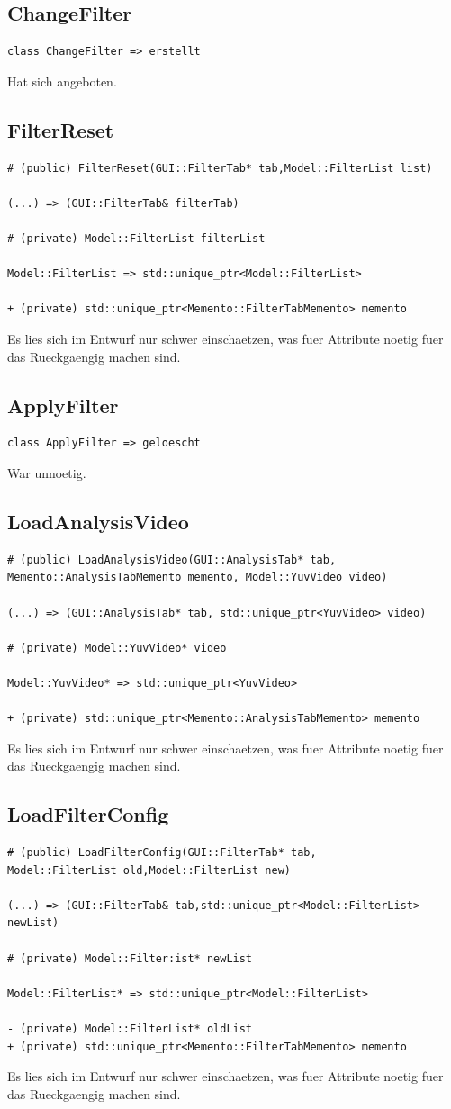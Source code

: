 \documentclass[parskip=full]{scrartcl}
\begin{document}
\subsection{ChangeFilter}
\begin{verbatim}
class ChangeFilter => erstellt
\end{verbatim}
Hat sich angeboten.
\subsection{FilterReset}
\begin{verbatim}
# (public) FilterReset(GUI::FilterTab* tab,Model::FilterList list)

(...) => (GUI::FilterTab& filterTab)

# (private) Model::FilterList filterList

Model::FilterList => std::unique_ptr<Model::FilterList>

+ (private) std::unique_ptr<Memento::FilterTabMemento> memento
\end{verbatim}
Es lies sich im Entwurf nur schwer einschaetzen, was fuer Attribute noetig fuer das Rueckgaengig machen sind. 
\subsection{ApplyFilter}
\begin{verbatim}
class ApplyFilter => geloescht
\end{verbatim}
War unnoetig.
\subsection{LoadAnalysisVideo}
\begin{verbatim}
# (public) LoadAnalysisVideo(GUI::AnalysisTab* tab, 
Memento::AnalysisTabMemento memento, Model::YuvVideo video)

(...) => (GUI::AnalysisTab* tab, std::unique_ptr<YuvVideo> video)

# (private) Model::YuvVideo* video

Model::YuvVideo* => std::unique_ptr<YuvVideo>

+ (private) std::unique_ptr<Memento::AnalysisTabMemento> memento
\end{verbatim}
Es lies sich im Entwurf nur schwer einschaetzen, was fuer Attribute noetig fuer das Rueckgaengig machen sind. 
\subsection{LoadFilterConfig}
\begin{verbatim}
# (public) LoadFilterConfig(GUI::FilterTab* tab,
Model::FilterList old,Model::FilterList new)

(...) => (GUI::FilterTab& tab,std::unique_ptr<Model::FilterList> newList)

# (private) Model::Filter:ist* newList

Model::FilterList* => std::unique_ptr<Model::FilterList>

- (private) Model::FilterList* oldList
+ (private) std::unique_ptr<Memento::FilterTabMemento> memento
\end{verbatim}
Es lies sich im Entwurf nur schwer einschaetzen, was fuer Attribute noetig fuer das Rueckgaengig machen sind.
\end{document}
